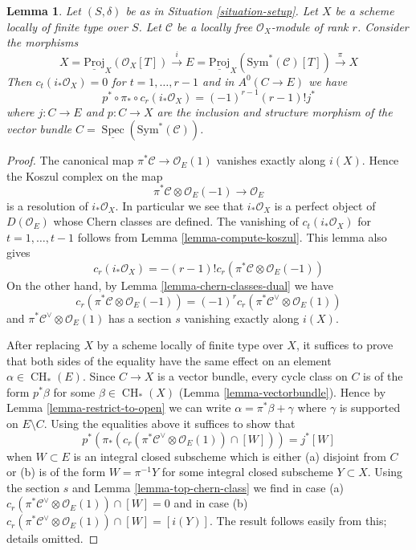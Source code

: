 \documentclass[10pt,a4paper]{amsart}
\theoremstyle{plain}
\newtheorem{lemma}[subsection]{Lemma}
\theoremstyle{definition}
\theoremstyle{remark}
\numberwithin{equation}{subsection}
\def\Spec{\mathop{\mathrm{Spec}}}
\def\CH{\mathop{\mathrm{CH}}\nolimits}
\begin{document}
\begin{lemma}
\label{lemma-compute-section}
Let $(S, \delta)$ be as in Situation \ref{situation-setup}. Let $X$
be a scheme locally of finite type over $S$. Let $\mathcal{C}$
be a locally free $\mathcal{O}_X$-module of rank $r$. Consider the
morphisms
$$
X = \underline{\text{Proj}}_X(\mathcal{O}_X[T])
\xrightarrow{i}
E = \underline{\text{Proj}}_X(\text{Sym}^*(\mathcal{C})[T])
\xrightarrow{\pi}
X
$$
Then $c_t(i_*\mathcal{O}_X) = 0$ for $t = 1, \ldots, r - 1$ and in
$A^0(C \to E)$ we have
$$
p^* \circ \pi_* \circ c_r(i_*\mathcal{O}_X) = (-1)^{r - 1}(r - 1)! j^*
$$
where
$j : C \to E$ and $p : C \to X$ are the inclusion and structure
morphism of the vector bundle
$C = \underline{\Spec}(\text{Sym}^*(\mathcal{C}))$.
\end{lemma}

\begin{proof}
The canonical map $\pi^*\mathcal{C} \to \mathcal{O}_E(1)$ vanishes
exactly along $i(X)$. Hence the Koszul complex on the map
$$
\pi^*\mathcal{C} \otimes \mathcal{O}_E(-1) \to \mathcal{O}_E
$$
is a resolution of $i_*\mathcal{O}_X$. In particular we see that
$i_*\mathcal{O}_X$ is a perfect object of $D(\mathcal{O}_E)$
whose Chern classes are defined. The vanishing of $c_t(i_*\mathcal{O}_X)$
for $t = 1, \ldots, t - 1$ follows from Lemma \ref{lemma-compute-koszul}.
This lemma also gives
$$
c_r(i_*\mathcal{O}_X) = - (r - 1)!
c_r(\pi^*\mathcal{C} \otimes \mathcal{O}_E(-1))
$$
On the other hand, by Lemma \ref{lemma-chern-classes-dual} we have
$$
c_r(\pi^*\mathcal{C} \otimes \mathcal{O}_E(-1)) =
(-1)^r c_r(\pi^*\mathcal{C}^\vee \otimes \mathcal{O}_E(1))
$$
and $\pi^*\mathcal{C}^\vee \otimes \mathcal{O}_E(1)$ has a section $s$
vanishing exactly along $i(X)$.

\medskip\noindent
After replacing $X$ by a scheme locally of finite type over $X$,
it suffices to prove that both sides of the equality have the
same effect on an element $\alpha \in \CH_*(E)$. Since $C \to X$
is a vector bundle, every cycle class on $C$ is of the form $p^*\beta$
for some $\beta \in \CH_*(X)$ (Lemma \ref{lemma-vectorbundle}).
Hence by Lemma \ref{lemma-restrict-to-open}
we can write $\alpha = \pi^*\beta + \gamma$ where $\gamma$
is supported on $E \setminus C$. Using the equalities above
it suffices to show that
$$
p^*(\pi_*(c_r(\pi^*\mathcal{C}^\vee \otimes \mathcal{O}_E(1)) \cap [W])) =
j^*[W]
$$
when $W \subset E$ is an integral closed subscheme which
is either (a) disjoint from $C$ or (b) is of the form $W = \pi^{-1}Y$
for some integral closed subscheme $Y \subset X$.
Using the section $s$ and Lemma \ref{lemma-top-chern-class} we find
in case (a) $c_r(\pi^*\mathcal{C}^\vee \otimes \mathcal{O}_E(1)) \cap [W] = 0$
and in case (b)
$c_r(\pi^*\mathcal{C}^\vee \otimes \mathcal{O}_E(1)) \cap [W] = [i(Y)]$.
The result follows easily from this; details omitted.
\end{proof}
\end{document}
